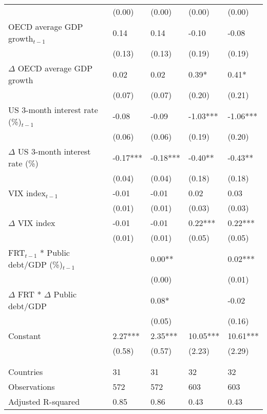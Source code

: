 \begin{tabular}{lp{3cm}p{3cm}p{3cm}p{3cm}}
   & (0.00) & (0.00) & (0.00) & (0.00) \\ 
  OECD average GDP growth$_{t-1}$ & 0.14 & 0.14 & -0.10 & -0.08 \\ 
   & (0.13) & (0.13) & (0.19) & (0.19) \\ 
  $\Delta$ OECD average GDP growth & 0.02 & 0.02 & 0.39* & 0.41* \\ 
   & (0.07) & (0.07) & (0.20) & (0.21) \\ 
  US 3-month interest rate (\%)$_{t-1}$ & -0.08 & -0.09 & -1.03*** & -1.06*** \\ 
   & (0.06) & (0.06) & (0.19) & (0.20) \\ 
  $\Delta$ US 3-month interest rate (\%) & -0.17*** & -0.18*** & -0.40** & -0.43** \\ 
   & (0.04) & (0.04) & (0.18) & (0.18) \\ 
  VIX index$_{t-1}$ & -0.01 & -0.01 & 0.02 & 0.03 \\ 
   & (0.01) & (0.01) & (0.03) & (0.03) \\ 
  $\Delta$ VIX index & -0.01 & -0.01 & 0.22*** & 0.22*** \\ 
   & (0.01) & (0.01) & (0.05) & (0.05) \\ 
  FRT$_{t-1}$ * Public debt/GDP (\%)$_{t-1}$ &  & 0.00** &  & 0.02*** \\ 
   &  & (0.00) &  & (0.01) \\ 
  $\Delta$ FRT * $\Delta$ Public debt/GDP &  & 0.08* &  & -0.02 \\ 
   &  & (0.05) &  & (0.16) \\ 
  Constant & 2.27*** & 2.35*** & 10.05*** & 10.61*** \\ 
   & (0.58) & (0.57) & (2.23) & (2.29) \\ 
   &  &  &  &  \\ 
   &  &  &  &  \\ 
  Countries & 31 & 31 & 32 & 32 \\ 
  Observations & 572 & 572 & 603 & 603 \\ 
  Adjusted R-squared & 0.85 & 0.86 & 0.43 & 0.43 \\ 
   \hline
\end{tabular}
\endgroup
